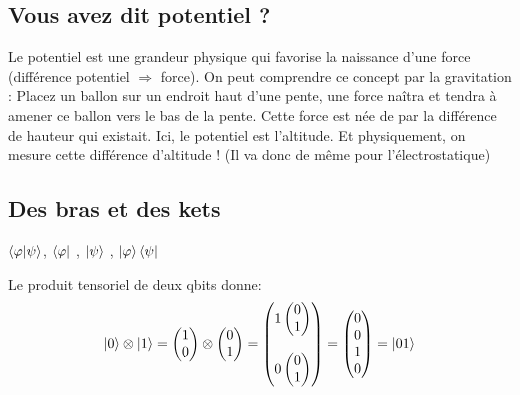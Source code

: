 \subsection{Vous avez dit potentiel ?}
Le potentiel est une grandeur physique qui favorise la naissance d’une force
(différence potentiel $\Rightarrow$ force). On peut comprendre ce concept par la gravitation :
Placez un ballon sur un endroit haut d’une pente, une force naîtra et tendra à
amener ce ballon vers le bas de la pente. Cette force est née de par la différence
de hauteur qui existait. Ici, le potentiel est l’altitude. Et physiquement, on mesure
cette différence d’altitude ! (Il va donc de même pour l’électrostatique)

\subsection{Des bras et des kets}
$\braket{\varphi|\psi}$, $\bra{\varphi}$ , $\ket{\psi}$ , $\ket{\varphi}\bra{\psi}$

Le produit tensoriel de deux qbits donne:
\begin{equation}
    \ket{0}\otimes\ket{1}=
    \begin{pmatrix}
        1\\
        0
    \end{pmatrix}
    \otimes
    \begin{pmatrix}
        0\\
        1
    \end{pmatrix}
    =
    \begin{pmatrix}
        1 \begin{pmatrix}
            0\\
            1
        \end{pmatrix}
        \\ \\
        0 \begin{pmatrix}
            0\\
            1
        \end{pmatrix}
    \end{pmatrix}
    =
    \begin{pmatrix}
        0\\
        0\\
        1\\
        0
    \end{pmatrix}
    =\ket{01}
\end{equation}

